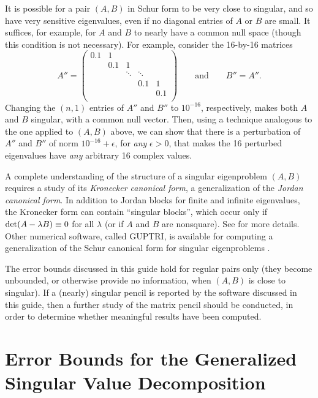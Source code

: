 It is possible for a pair $(A,B)$ in Schur form to be very close to singular,
and so have very sensitive eigenvalues, even if no diagonal entries of
$A$ or $B$ are small.
It suffices, for example, for $A$ and $B$ to nearly have a common null space
(though this condition is not necessary).
For example, consider the 16-by-16 matrices
\[
A'' = \left( \begin{array}{ccccc}
           0.1 & 1   &        &        &     \\
               & 0.1 & 1      &        &     \\
               &     & \ddots & \ddots &      \\
               &     &        & 0.1    &  1   \\
               &     &        &        & 0.1   \\
           \end{array} \right) \quad\quad
\mbox{and} \quad\quad B'' = A''.
\]
Changing the $(n,1)$ entries of $A''$ and $B''$ to $10^{-16}$, respectively,
makes both $A$ and $B$ singular, with a common null vector.
Then, using a technique analogous to the one applied to $(A,B)$ above,
we can show that there is a
perturbation of $A''$ and $B''$ of norm $10^{-16} + \epsilon$,
for {\em any} $\epsilon>0$, that makes the 16 perturbed eigenvalues
have {\em any} arbitrary 16 complex values.

A complete understanding of the structure of a singular eigenproblem
$(A,B)$ requires a study of its {\em Kronecker canonical form},
a generalization of the {\em Jordan canonical form}.
In addition to Jordan blocks for finite and infinite eigenvalues,
the Kronecker form can contain ``singular blocks'', which occur only
if ${\rm det}(A- \lambda B) \equiv 0$ for all $\lambda$ (or if $A$ and $B$
are nonsquare).
See \cite{gantmacher,stewart72,wilkinson79,vandooren79,demmelkagstrom87} for
more details. Other numerical software, called GUPTRI,
is available for
computing a generalization of the
Schur canonical form for singular eigenproblems
\cite{demmelkagstrom93a,demmelkagstrom93b}.

The error bounds discussed in this guide hold for regular pairs only
(they become unbounded, or otherwise provide no information, when
$(A,B)$ is close to singular).  If a (nearly) singular pencil is reported
by the software discussed in this guide, then a further study of the matrix
pencil should be conducted, in order to determine whether meaningful results
have been computed.

\section{Error Bounds for the Generalized Singular Value Decomposition}
\label{secGSVDbound}

